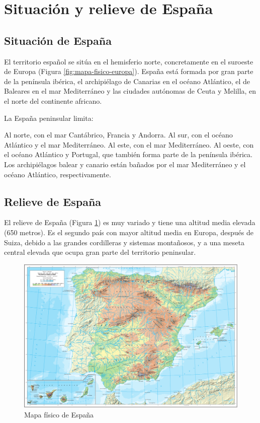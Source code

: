 \section{Situación y relieve de España}

\subsection{Situación de España}

El territorio español se sitúa en el hemisferio norte, concretamente en el suroeste de Europa (Figura \ref{fig:mapa-fisico-europa}). España está formada por gran parte de la península ibérica, el archipiélago de Canarias en el océano Atlántico, el de Baleares en el mar Mediterráneo y las ciudades autónomas de Ceuta y Melilla, en el norte del continente africano.

\vspace{3mm}
La España peninsular limita:

Al norte, con el mar Cantábrico, Francia y Andorra. Al sur, con el océano Atlántico y el mar Mediterráneo. Al este, con el mar Mediterráneo. Al oeste, con el océano Atlántico y Portugal, que también forma parte de la península ibérica. Los archipiélagos balear y canario están bañados por el mar Mediterráneo y el océano Atlántico, respectivamente.

\subsection{Relieve de España}

El relieve de España (Figura \ref{fig:mapa-fisico-españa}) es muy variado y tiene una altitud media elevada (650 metros). Es el segundo país con mayor altitud media en Europa, después de Suiza, debido a las grandes cordilleras y sistemas montañosos, y a una meseta central elevada que ocupa gran parte del territorio peninsular.

\begin{figure}[!ht]
    \centering
    \includegraphics[width=1\linewidth]{Tema2/02_mapa-fisico-espana-normal.pdf}
    \caption{Mapa físico de España}
    \label{fig:mapa-fisico-españa}
\end{figure}

